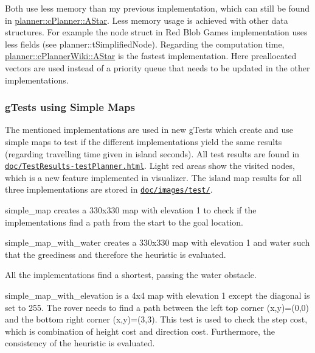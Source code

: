 Both use less memory than my previous implementation, which can still be found in \mbox{\hyperlink{classplanner_1_1c_planner_a341e70531266f023ac9461d18979d1ef}{planner\+::c\+Planner\+::\+A\+Star}}. Less memory usage is achieved with other data structures. For example the node struct in Red Blob Games implementation uses less fields (see planner\+::t\+Simplified\+Node). Regarding the computation time, \mbox{\hyperlink{classplanner_1_1c_planner_wiki_a2652cf0e84d0a1fcd17e6c4288179955}{planner\+::c\+Planner\+Wiki\+::\+A\+Star}} is the fastest implementation. Here preallocated vectors are used instead of a priority queue that needs to be updated in the other implementations.

\subsubsection*{g\+Tests using Simple Maps}

The mentioned implementations are used in new g\+Tests which create and use simple maps to test if the different implementations yield the same results (regarding travelling time given in island seconds). All test results are found in \href{doc/TestResults-testPlanner.html}{\tt doc/\+Test\+Results-\/test\+Planner.\+html}. Light red areas show the visited nodes, which is a new feature implemented in visualizer. The island map results for all three implementations are stored in \href{doc/images/test/}{\tt doc/images/test/}.


\begin{DoxyEnumerate}
\item simple\+\_\+map creates a 330x330 map with elevation 1 to check if the implementations find a path from the start to the goal location.
\end{DoxyEnumerate}




\begin{DoxyEnumerate}
\item simple\+\_\+map\+\_\+with\+\_\+water creates a 330x330 map with elevation 1 and water such that the greediness and therefore the heuristic is evaluated.
\end{DoxyEnumerate}



All the implementations find a shortest, passing the water obstacle.


\begin{DoxyEnumerate}
\item simple\+\_\+map\+\_\+with\+\_\+elevation is a 4x4 map with elevation 1 except the diagonal is set to 255. The rover needs to find a path between the left top corner (x,y)=(0,0) and the bottom right corner (x,y)=(3,3). This test is used to check the step cost, which is combination of height cost and direction cost. Furthermore, the consistency of the heuristic is evaluated.
\end{DoxyEnumerate}



